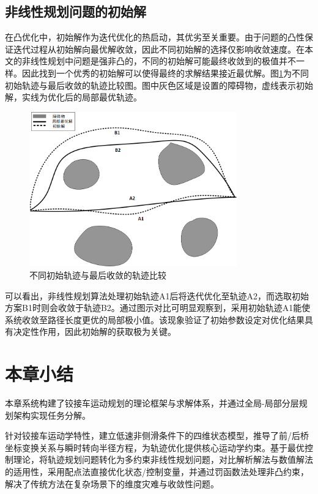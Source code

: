 \documentclass[master,academic]{ysuthesis} %
\begin{document}
		\subsection{非线性规划问题的初始解}
		在凸优化中，初始解作为迭代优化的热启动，其优劣至关重要。由于问题的凸性保证迭代过程从初始解向最优解收敛，因此不同初始解的选择仅影响收敛速度。在本文的非线性规划中问题是强非凸的，不同的初始解可能最终收敛到的极值并不一样。因此找到一个优秀的初始解可以使得最终的求解结果接近最优解。图\ref{fig:不同初解}为不同初始轨迹与最后收敛的轨迹比较图。图中灰色区域是设置的障碍物，虚线表示初始解，实线为优化后的局部最优轨迹。
		\begin{figure}[H]
			\centering
			\includegraphics[width=0.8\textwidth]{不同初解.png}
			\caption{不同初始轨迹与最后收敛的轨迹比较}
			\label{fig:不同初解}
		\end{figure}
		可以看出，非线性规划算法处理初始轨迹A1后将迭代优化至轨迹A2，而选取初始方案B1时则会收敛于轨迹B2。通过图示对比可明显观察到，采用初始轨迹A1能使系统收敛至路径长度更优的局部极小值。该现象验证了初始参数设定对优化结果具有决定性作用，因此初始解的获取极为关键。

	\section{本章小结}
	本章系统构建了铰接车运动规划的理论框架与求解体系，并通过全局-局部分层规划架构实现任务分解。

	针对铰接车运动学特性，建立低速非侧滑条件下的四维状态模型，推导了前/后桥坐标变换关系与瞬时转向半径方程，为轨迹优化提供核心运动学约束。基于最优控制理论，将轨迹规划问题转化为多约束非线性规划问题，对比解析解法与数值解法的适用性，采用配点法直接优化状态/控制变量，并通过罚函数法处理非凸约束，解决了传统方法在复杂场景下的维度灾难与收敛性问题。
\end{document}
